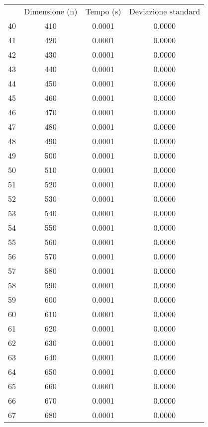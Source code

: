 \begin{table}
\centering
\begin{adjustbox}{width=1\textwidth/2}
\begin{tabular}{|c|c|c|c|}
\hline
 & Dimensione (n) & Tempo (s) & Deviazione standard \\
40 & 410 & 0.0001 & 0.0000 \\
\cline{1-4}
41 & 420 & 0.0001 & 0.0000 \\
\cline{1-4}
42 & 430 & 0.0001 & 0.0000 \\
\cline{1-4}
43 & 440 & 0.0001 & 0.0000 \\
\cline{1-4}
44 & 450 & 0.0001 & 0.0000 \\
\cline{1-4}
45 & 460 & 0.0001 & 0.0000 \\
\cline{1-4}
46 & 470 & 0.0001 & 0.0000 \\
\cline{1-4}
47 & 480 & 0.0001 & 0.0000 \\
\cline{1-4}
48 & 490 & 0.0001 & 0.0000 \\
\cline{1-4}
49 & 500 & 0.0001 & 0.0000 \\
\cline{1-4}
50 & 510 & 0.0001 & 0.0000 \\
\cline{1-4}
51 & 520 & 0.0001 & 0.0000 \\
\cline{1-4}
52 & 530 & 0.0001 & 0.0000 \\
\cline{1-4}
53 & 540 & 0.0001 & 0.0000 \\
\cline{1-4}
54 & 550 & 0.0001 & 0.0000 \\
\cline{1-4}
55 & 560 & 0.0001 & 0.0000 \\
\cline{1-4}
56 & 570 & 0.0001 & 0.0000 \\
\cline{1-4}
57 & 580 & 0.0001 & 0.0000 \\
\cline{1-4}
58 & 590 & 0.0001 & 0.0000 \\
\cline{1-4}
59 & 600 & 0.0001 & 0.0000 \\
\cline{1-4}
60 & 610 & 0.0001 & 0.0000 \\
\cline{1-4}
61 & 620 & 0.0001 & 0.0000 \\
\cline{1-4}
62 & 630 & 0.0001 & 0.0000 \\
\cline{1-4}
63 & 640 & 0.0001 & 0.0000 \\
\cline{1-4}
64 & 650 & 0.0001 & 0.0000 \\
\cline{1-4}
65 & 660 & 0.0001 & 0.0000 \\
\cline{1-4}
66 & 670 & 0.0001 & 0.0000 \\
\cline{1-4}
67 & 680 & 0.0001 & 0.0000 \\
\cline{1-4}

\end{tabular}
\end{adjustbox}
\end{table}
